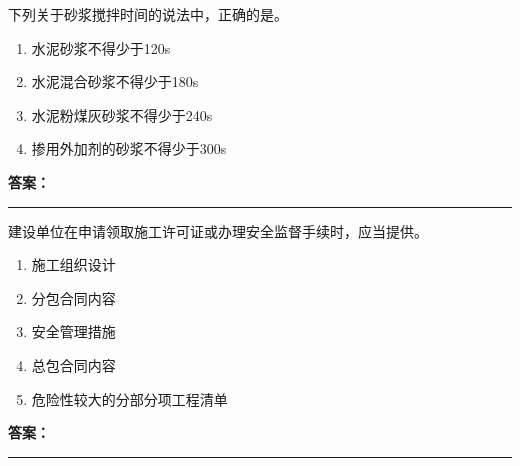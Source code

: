\documentclass[UTF8,fontset=fandol,11pt]{ctexart}
\newcommand{\answerline}{\textcolor{answerred}{\rule{2.4cm}{0.7pt}}}
\begin{document}
\begin{quizbox}[title={乱序第 79 题｜第六章砌筑工程}]

下列关于砂浆搅拌时间的说法中，正确的是。\\

\begin{enumerate}[label=\Alph*.]

\item 水泥砂浆不得少于120s

\item 水泥混合砂浆不得少于180s

\item 水泥粉煤灰砂浆不得少于240s

\item 掺用外加剂的砂浆不得少于300s

\end{enumerate}

\textbf{\textcolor{answerred}{答案：}} \answerline

\end{quizbox}

\vspace{0.2em}

\begin{quizbox}[title={乱序第 80 题｜第七章脚手架工程}]

建设单位在申请领取施工许可证或办理安全监督手续时，应当提供。\\

\begin{enumerate}[label=\Alph*.]

\item 施工组织设计

\item 分包合同内容

\item 安全管理措施

\item 总包合同内容

\item 危险性较大的分部分项工程清单

\end{enumerate}

\textbf{\textcolor{answerred}{答案：}} \answerline

\end{quizbox}

\vspace{0.2em}
\end{document}
